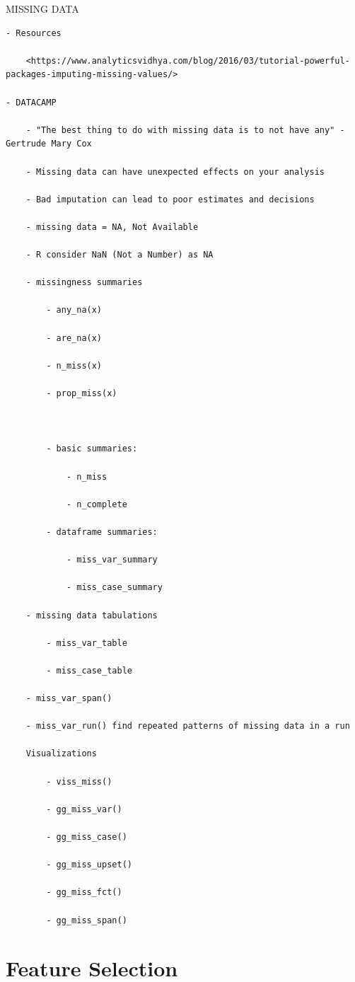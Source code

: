\documentclass[
]{book}
\begin{document}
MISSING DATA

\begin{verbatim}
- Resources

    <https://www.analyticsvidhya.com/blog/2016/03/tutorial-powerful-packages-imputing-missing-values/>

- DATACAMP

    - "The best thing to do with missing data is to not have any" - Gertrude Mary Cox

    - Missing data can have unexpected effects on your analysis

    - Bad imputation can lead to poor estimates and decisions

    - missing data = NA, Not Available

    - R consider NaN (Not a Number) as NA

    - missingness summaries

        - any_na(x)

        - are_na(x)

        - n_miss(x)

        - prop_miss(x)



        - basic summaries:

            - n_miss

            - n_complete

        - dataframe summaries:

            - miss_var_summary

            - miss_case_summary

    - missing data tabulations

        - miss_var_table

        - miss_case_table

    - miss_var_span()

    - miss_var_run() find repeated patterns of missing data in a run

    Visualizations

        - viss_miss()

        - gg_miss_var()

        - gg_miss_case()

        - gg_miss_upset()

        - gg_miss_fct()

        - gg_miss_span()
\end{verbatim}

\hypertarget{feature-selection}{%
\section{Feature Selection}\label{feature-selection}}
\end{document}
